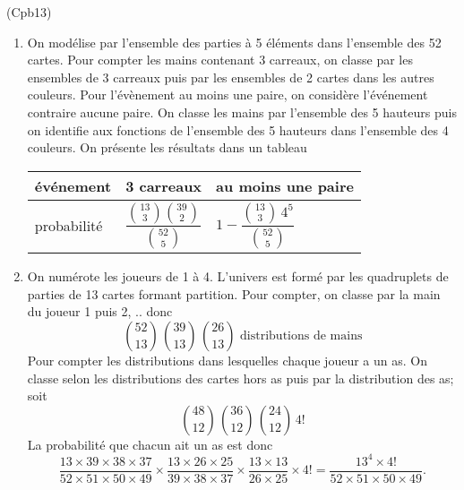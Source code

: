 \begin{tiny}(Cpb13)\end{tiny} 
\begin{enumerate}
  \item On modélise par l'ensemble des parties à 5 éléments dans l'ensemble des 52 cartes.\newline
Pour compter les mains contenant 3 carreaux, on classe par les ensembles de 3 carreaux puis par les ensembles de 2 cartes dans les autres couleurs.\newline
Pour l'évènement \og au moins une paire\fg, on considère l'événement contraire \og aucune paire\fg. On classe les mains par l'ensemble des 5 hauteurs puis on identifie aux fonctions de l'ensemble des 5 hauteurs dans l'ensemble des 4 couleurs. On présente les résultats dans un tableau
\begin{center}
\renewcommand{\arraystretch}{2.5}
\begin{tabular}{l|l|l}
événement   & 3 carreaux                                        & au moins une paire\\ \hline 
probabilité & $\dfrac{\binom{13}{3}\binom{39}{2}}{\binom{52}{5}}$ & $1 - \dfrac{\binom{13}{3}\, 4^5}{\binom{52}{5}}$
\end{tabular}
\end{center}
  \item On numérote les joueurs de 1 à 4. L'univers est formé par les quadruplets de parties  de 13 cartes formant partition. Pour compter, on classe par la main du joueur 1 puis 2, .. donc
\[
  \binom{52}{13}\, \binom{39}{13}\,\binom{26}{13} \text{ distributions de mains}
\]
Pour compter les distributions dans lesquelles chaque joueur a un as. On classe selon les distributions des cartes hors as puis par la distribution des as; soit 
\[
  \binom{48}{12}\, \binom{36}{12}\,\binom{24}{12}\, 4!
\]
La probabilité que chacun ait un as est donc
\[
  \frac{13\times 39 \times 38 \times 37}{52\times 51 \times 50 \times 49}
  \times
  \frac{13\times 26 \times 25}{39\times 38 \times 37}
  \times
  \frac{13\times 13}{26\times 25} \times 4!
  = \frac{13^4 \times 4!}{52\times 51 \times 50 \times 49}.
\]

\end{enumerate}

